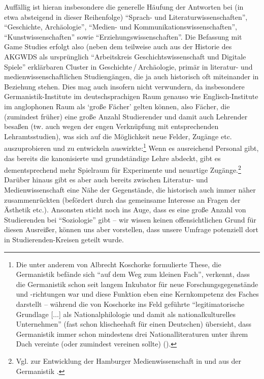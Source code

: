 \documentclass{scrartcl}
\begin{document}
Auffällig ist hieran insbesondere die generelle Häufung der Antworten bei (in etwa absteigend in dieser Reihenfolge) \enquote{Sprach- und Literaturwissenschaften}, \enquote{Geschichte, Archäologie}, \enquote{Medien- und Kommunikationswissenschaften}, \enquote{Kunstwissenschaften} sowie \enquote{Erziehungswissenschaften}.
Die Befassung mit Game Studies erfolgt also (neben dem teilweise auch aus der Historie des AKGWDS als ursprünglich \enquote{Arbeitskreis Geschichtswissenschaft und Digitale Spiele} erklärbaren Cluster in Geschichte\,/\,Archäologie, primär in literatur- und medienwissenschaftlichen Studiengängen, die ja auch historisch oft miteinander in Beziehung stehen.
Dies mag auch insofern nicht verwundern, da insbesondere Germanistik-Institute im deutschsprachigen Raum genauso wie Englisch-Institute im anglophonen Raum als \enquote*{große Fächer} gelten können, also Fächer, die (zumindest früher) eine große Anzahl Studierender und damit auch Lehrender besaßen (tw. auch wegen der engen Verknüpfung mit entsprechenden Lehramtsstudien), was sich auf die Möglichkeit neue Felder, Zugänge etc. auszuprobieren und zu entwickeln auswirkte:\footnote{Die unter anderem von Albrecht Koschorke formulierte These, die Germanistik befände sich \enquote{auf dem Weg zum kleinen Fach}, verkennt, dass die Germanistik schon seit langem Inkubator für neue Forschungsgegenstände und -richtungen war und diese Funktion eben eine Kernkompetenz des Faches darstellt -- während die von Koschorke ins Feld geführte \enquote{legitimatorische Grundlage [$\ldots$] als Nationalphilologie und damit als nationalkulturelles Unternehmen} (fast schon klischeehaft für einen Deutschen) übersieht, dass Germanistik immer schon mindestens drei Nationalliteraturen unter ihrem Dach vereinte (oder zumindest vereinen sollte) (\autocite[vgl.][S.~590]{koschorke_germanistik_2015}).}
Wenn es ausreichend Personal gibt, das bereits die kanonisierte und grundständige Lehre abdeckt, gibt es dementsprechend mehr Spielraum für Experimente und neuartige Zugänge.\footnote{Vgl. zur Entwicklung der Hamburger Medienwissenschaft in und aus der Germanistik \autocite[][S.~35–56]{hickethier_binnendifferenzierung_2000}.}
Darüber hinaus gibt es aber auch bereits zwischen Literatur- und Medienwissenschaft eine Nähe der Gegenstände, die historisch auch immer näher zusammenrückten (befördert durch das gemeinsame Interesse an Fragen der Ästhetik etc.).
Ansonsten sticht noch ins Auge, dass es eine große Anzahl von Studierenden bei \enquote{Soziologie} gibt -- wir wissen keinen offensichtlichen Grund für diesen Ausreißer, können uns aber vorstellen, dass unsere Umfrage potenziell dort in Studierenden-Kreisen geteilt wurde.
\end{document}

